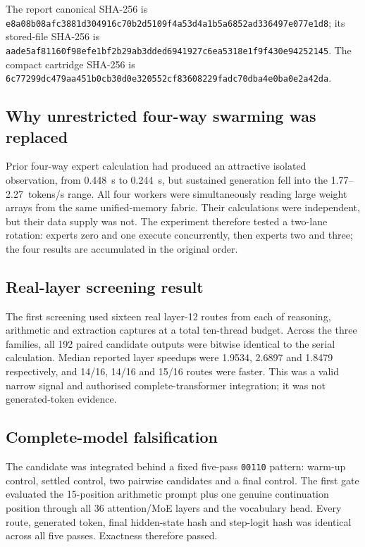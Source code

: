 The report canonical SHA-256 is
\texttt{e8a08b08afc3881d304916c70b2d5109f4a53d4a1b5a6852ad336497e077e1d8};
its stored-file SHA-256 is
\texttt{aade5af81160f98efe1bf2b29ab3dded6941927c6ea5318e1f9f430e94252145}.
The compact cartridge SHA-256 is
\texttt{6c77299dc479aa451b0cb30d0e320552cf83608229fadc70dba4e0ba0e2a42da}.

\subsection{Why unrestricted four-way swarming was replaced}

Prior four-way expert calculation had produced an attractive isolated
observation, from 0.448~s to 0.244~s, but sustained generation fell into the
1.77--2.27~tokens/s range.  All four workers were simultaneously reading large
weight arrays from the same unified-memory fabric.  Their calculations were
independent, but their data supply was not.  The experiment therefore tested a
two-lane rotation: experts zero and one execute concurrently, then experts two
and three; the four results are accumulated in the original order.

\subsection{Real-layer screening result}

The first screening used sixteen real layer-12 routes from each of reasoning,
arithmetic and extraction captures at a total ten-thread budget.  Across the
three families, all 192 paired candidate outputs were bitwise identical to the
serial calculation.  Median reported layer speedups were 1.9534, 2.6897 and
1.8479 respectively, and 14/16, 14/16 and 15/16 routes were faster.  This was a
valid narrow signal and authorised complete-transformer integration; it was
not generated-token evidence.

\subsection{Complete-model falsification}

The candidate was integrated behind a fixed five-pass \texttt{00110} pattern:
warm-up control, settled control, two pairwise candidates and a final control.
The first gate evaluated the 15-position arithmetic prompt plus one genuine
continuation position through all 36 attention/MoE layers and the vocabulary
head.  Every route, generated token, final hidden-state hash and step-logit hash
was identical across all five passes.  Exactness therefore passed.

